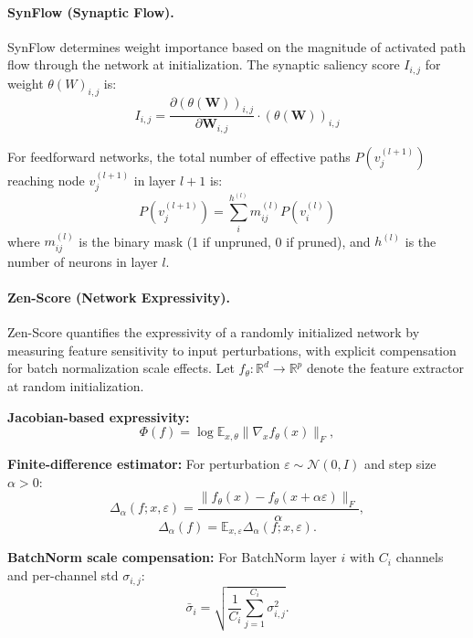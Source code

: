 \paragraph{SynFlow (Synaptic Flow).}
SynFlow \cite{tanaka2020pruning} determines weight importance based on the magnitude of activated path flow through the network at initialization. The synaptic saliency score $I_{i,j}$ for weight $\theta(W)_{i,j}$ is:
\begin{equation}
	I_{i,j} = \frac{\partial (\theta(\mathbf{W}))_{i,j}}{\partial \mathbf{W}_{i,j}} \cdot (\theta(\mathbf{W}))_{i,j}
\end{equation}

For feedforward networks, the total number of effective paths $P(v^{(l+1)}_j)$ reaching node $v^{(l+1)}_j$ in layer $l+1$ is:
\begin{equation}
	P(v^{(l+1)}_j) = \sum_{i}^{h^{(l)}} m^{(l)}_{ij} P(v^{(l)}_i)
\end{equation}
where $m^{(l)}_{ij}$ is the binary mask (1 if unpruned, 0 if pruned), and $h^{(l)}$ is the number of neurons in layer $l$.

\paragraph{Zen-Score (Network Expressivity).}
Zen-Score \cite{lin2021zen} quantifies the expressivity of a randomly initialized network by measuring feature sensitivity to input perturbations, with explicit compensation for batch normalization scale effects. Let $f_\theta:\mathbb{R}^d\to\mathbb{R}^p$ denote the feature extractor at random initialization. 

\textbf{Jacobian-based expressivity:}
\begin{equation}\label{eq:phi}
	\Phi(f) = \log \mathbb{E}_{x,\theta}\|\nabla_x f_\theta(x)\|_F,
\end{equation}

\textbf{Finite-difference estimator:} For perturbation $\varepsilon\sim\mathcal{N}(0,I)$ and step size $\alpha>0$:
\begin{equation}\label{eq:delta}
	\Delta_{\alpha}(f; x,\varepsilon) = \frac{\| f_\theta(x) - f_\theta(x+\alpha \varepsilon)\|_F}{\alpha},
\end{equation}
\begin{equation}
	\Delta_\alpha(f) = \mathbb{E}_{x,\varepsilon} \Delta_{\alpha}(f;x,\varepsilon).
\end{equation}

\textbf{BatchNorm scale compensation:} For BatchNorm layer $i$ with $C_i$ channels and per-channel std $\sigma_{i,j}$:
\begin{equation}
	\bar{\sigma}_i = \sqrt{\frac{1}{C_i}\sum_{j=1}^{C_i} \sigma_{i,j}^2 }.
\end{equation}

